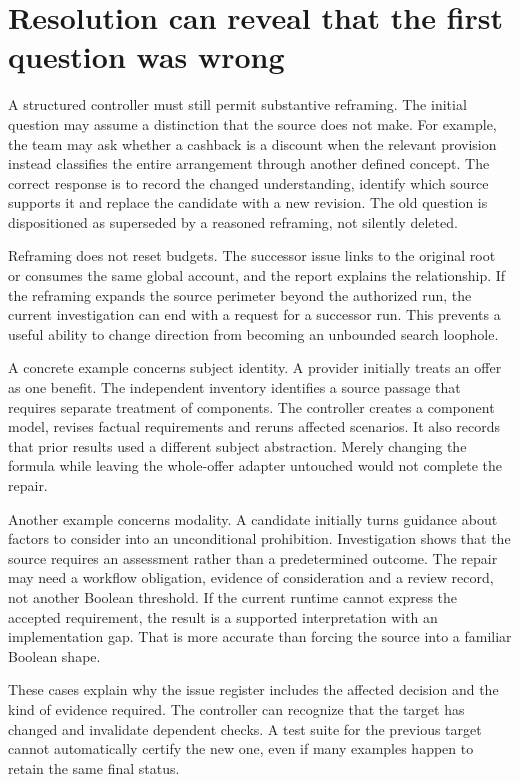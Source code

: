 \documentclass[12pt,a4paper,oneside,openany]{book}
\begin{document}
\section{Resolution can reveal that the first question was wrong}
\label{merge:M06:10}


A structured controller must still permit substantive reframing. The initial
question may assume a distinction that the source does not make. For example,
the team may ask whether a cashback is a discount when the relevant provision
instead classifies the entire arrangement through another defined concept.
The correct response is to record the changed understanding, identify which
source supports it and replace the candidate with a new revision. The old question
is dispositioned as superseded by a reasoned reframing, not silently deleted.

Reframing does not reset budgets. The successor issue links to the original root
or consumes the same global account, and the report explains the relationship.
If the reframing expands the source perimeter beyond the authorized run, the
current investigation can end with a request for a successor run. This prevents a
useful ability to change direction from becoming an unbounded search loophole.

A concrete example concerns subject identity. A provider initially treats an
offer as one benefit. The independent inventory identifies a source passage that
requires separate treatment of components. The controller creates a component
model, revises factual requirements and reruns affected scenarios. It also records
that prior results used a different subject abstraction. Merely changing the
formula while leaving the whole-offer adapter untouched would not complete the
repair.

Another example concerns modality. A candidate initially turns guidance about
factors to consider into an unconditional prohibition. Investigation shows that
the source requires an assessment rather than a predetermined outcome. The repair
may need a workflow obligation, evidence of consideration and a review record,
not another Boolean threshold. If the current runtime cannot express the accepted
requirement, the result is a supported interpretation with an implementation gap.
That is more accurate than forcing the source into a familiar Boolean shape.

These cases explain why the issue register includes the affected decision and the
kind of evidence required. The controller can recognize that the target has
changed and invalidate dependent checks. A test suite for the previous target
cannot automatically certify the new one, even if many examples happen to retain
the same final status.
\end{document}
